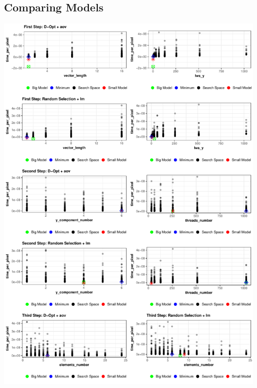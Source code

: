 \documentclass[final,12pt,a4paper]{article}
\begin{document}
\subsection{Comparing Models}
\label{sec:orge8ecc96}
\begin{center}
\includegraphics[width=.9\linewidth]{../img/model_comparison.pdf}
\end{center}
\end{document}
